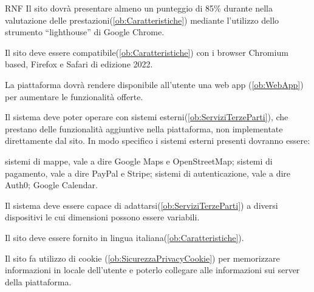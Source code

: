 \begin{listaPersonale}{RNF}
       Il sito dovrà presentare almeno un punteggio di 85\% durante nella valutazione delle prestazioni(\ref{ob:Caratteristiche}) mediante l'utilizzo dello strumento “lighthouse” di Google Chrome.

       Il sito deve essere compatibile(\ref{ob:Caratteristiche}) con i browser Chromium based, Firefox e Safari di edizione 2022.

       La piattaforma dovrà rendere disponibile all'utente una web app (\ref{ob:WebApp}) per aumentare le funzionalità offerte.

       Il sistema deve poter operare con sistemi esterni(\ref{ob:ServiziTerzeParti}), che prestano delle funzionalità aggiuntive nella piattaforma, non implementate direttamente dal sito. In modo specifico i sistemi esterni presenti dovranno essere:
\begin{listaPersonale2}[RNF]{}
             sistemi di mappe, vale a dire Google Maps e OpenStreetMap;
             sistemi di pagamento, vale a dire PayPal e Stripe;
             sistemi di autenticazione, vale a dire Auth0; %
             Google Calendar.
      \end{listaPersonale2}

       Il sistema deve essere capace di adattarsi(\ref{ob:ServiziTerzeParti}) a diversi dispositivi le cui dimensioni possono essere variabili.

       Il sito deve essere fornito in lingua italiana(\ref{ob:Caratteristiche}).

       Il sito fa utilizzo di cookie (\ref{ob:SicurezzaPrivacyCookie}) per memorizzare informazioni in locale dell'utente e poterlo collegare alle informazioni sui server della piattaforma.
\end{listaPersonale}